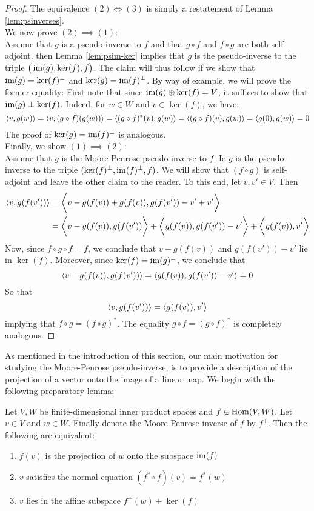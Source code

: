 \begin{proof}
	The equivalence $(2)\iff (3)$ is simply a restatement of Lemma \ref{lem:psinverses}.\\
	We now prove $(2)\implies (1)$:\\
	Assume that $g$ is a pseudo-inverse to $f$ and that $g\circ f$ and $f \circ g$ are both self-adjoint. then Lemma \ref{lem:psim-ker} implies that $g$ is the pseudo-inverse to the triple $\big(\operatorname{im}(g),\ker(f),f\big)$. The claim will thus follow if we show that $\operatorname{im}(g)=\ker(f)^\perp$ and $\ker(g)=\operatorname{im}(f)^\perp$. By way of example, we will prove the former equality: First note that since $\operatorname{im}(g)\oplus \ker(f)=V$, it suffices to show that $\operatorname{im}(g)\perp \ker(f)$. Indeed, for $w \in W$ and $v \in \ker(f)$, we have: 
	\[
	\left\langle v,g(w)\right\rangle=\left\langle v,(g\circ f)(g(w))\right\rangle=\left\langle (g\circ f)^*(v),g(w)\right\rangle=\left\langle (g\circ f)(v),g(w)\right\rangle=\left\langle g(0),g(w)\right\rangle=0
	\]
	The proof of $\ker(g)=\operatorname{im}(f)^\perp$ is analogous.\\
	Finally, we show $(1)\implies (2)$:\\
	Assume that $g$ is the Moore Penrose pseudo-inverse to $f$. Ie $g$ is the  pseudo-inverse to the triple $(\ker(f)^\perp,\operatorname{im}(f)^\perp,f)$. We will show that $(f\circ g)$ is self-adjoint and leave the other claim to the reader. To this end, let $v,v' \in V$. Then
	\begin{align*}
	\left\langle v,g(f(v'))\right\rangle&=\bigg\langle v-g(f(v))+g(f(v)), g(f(v'))-v'+v'\bigg\rangle\\
	&= \bigg\langle v-g(f(v)), g(f(v'))\bigg\rangle+\bigg\langle g(f(v)),g(f(v'))-v'\bigg\rangle+\bigg\langle g(f(v)), v'\bigg\rangle
	\end{align*}
	Now, since $f\circ g\circ f=f$, we conclude that $v-g(f(v))$ and $g(f(v'))-v'$ lie in $\ker(f)$. Moreover, since $\ker(f)=\operatorname{im}(g)^\perp$, we conclude that 
	\[
	\left\langle v-g(f(v)),g(f(v'))\right\rangle=\left\langle g(f(v)),g(f(v'))-v'\right\rangle=0
	\]
	So that 
	\[
	\left\langle v,g(f(v'))\right\rangle=\left\langle g(f(v)),v'\right\rangle
	\] implying that $f\circ g=(f\circ g)^*$. The equality $g\circ f = (g\circ f)^*$ is completely analogous.
\end{proof}

As mentioned in the introduction of this section, our main motivation for studying the Moore-Penrose pseudo-inverse, is to provide a description of the projection of a vector onto the image of a linear map. We begin with the following preparatory lemma:



\begin{lemma}\label{lem:proj=mppsinverse}
	Let $V,W$ be finite-dimensional inner product spaces and  $f \in \operatorname{Hom}(V,W)$. Let $v \in V$ and $w\in W$. Finally denote the Moore-Penrose inverse of $f$ by $f^+$. Then the following are equivalent:
	\begin{enumerate}
		\item $f(v)$ is the projection of $w$ onto the subspace $\operatorname{im}(f)$
		\item $v$ satisfies the normal equation $(f^*\circ f)(v)=f^*(w)$
		\item $v$ lies in the affine subspace $f^+(w) + \ker(f)$
	\end{enumerate}
\end{lemma}

